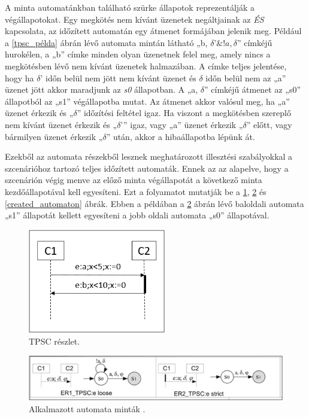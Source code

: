 A minta automatánkban található szürke állapotok reprezentálják a végállapotokat.
Egy megkötés nem kívánt üzenetek negáltjainak az \textit{ÉS} kapcsolata, az időzített automatán egy átmenet formájában jelenik meg.
Például a \ref{tpsc_példa} ábrán lévő automata mintán látható „b, $\delta ’\&!a, \delta$” címkéjű hurokélen, a „b” címke minden olyan üzenetnek felel meg, amely nincs a megkötésben lévő nem kívánt üzenetek halmazában.
A címke teljes jelentése, hogy ha $\delta$’ időn belül nem jött nem kívánt üzenet és $\delta$ időn belül nem az „a” üzenet jött akkor maradjunk az \textit{s0} állapotban.
A „a, $\delta$” címkéjű átmenet az „s0” állapotból az „s1” végállapotba mutat.
Az átmenet akkor valósul meg, ha „a” üzenet érkezik és „$\delta$” időzítési feltétel igaz.
Ha viszont a megkötésben szereplő nem kívánt üzenet érkezik és „$\delta$’” igaz, vagy „a” üzenet érkezik „$\delta$” előtt, vagy bármilyen üzenet érkezik „$\delta$” után, akkor a hibaállapotba lépünk át.

Ezekből az automata részekből lesznek meghatározott illesztési szabályokkal a szcenárióhoz tartozó teljes időzített automaták.
Ennek az az alapelve, hogy a szcenárión végig menve az előző minta végállapotát a következő minta kezdőállapotával kell egyesíteni.
Ezt a folyamatot mutatják be a \ref{tpsc_subset}, \ref{tpsc_used_patterns} és \ref{created_automaton} ábrák.
Ebben a példában a \ref{tpsc_used_patterns} ábrán lévő baloldali automata „s1” állapotát kellett egyesíteni a jobb oldali automata „s0” állapotával.

\begin{figure}[!ht]
    \centering
    \includegraphics[width=60mm, keepaspectratio]{figures/7abra.png}
    \caption{TPSC részlet.}
    \label{tpsc_subset}
\end{figure}

\begin{figure}[!ht]
    \centering
    \includegraphics[width=150mm, keepaspectratio]{figures/8abra.png}
    \caption{Alkalmazott automata minták \cite{TPSC1}.}
    \label{tpsc_used_patterns}
\end{figure}

